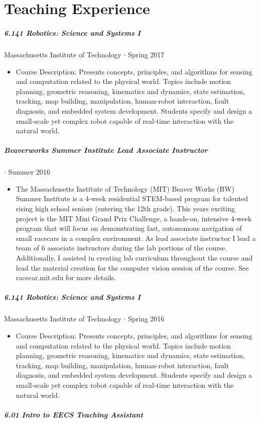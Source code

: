 \documentclass[10pt,letterpaper]{article}
\begin{document}
\section*{Teaching Experience}
\subparagraph{6.141 Robotics: Science and Systems I}
Massachusetts Institute of Technology $\cdot$ Spring 2017
\begin{itemize}
\item Course Description: Presents concepts, principles, and algorithms for sensing and computation related to the physical world. Topics include motion planning, geometric reasoning, kinematics and dynamics, state estimation, tracking, map building, manipulation, human-robot interaction, fault diagnosis, and embedded system development. Students specify and design a small-scale yet complex robot capable of real-time interaction with the natural world. 
\end{itemize}
\subparagraph{Beaverworks Summer Institute Lead Associate Instructor}
 $\cdot$ Summer 2016
\begin{itemize}
\item The Massachusetts Institute of Technology (MIT) Beaver Works (BW) Summer Institute is a 4-week residential STEM-based program for talented rising high school seniors (entering the 12th grade). This years exciting project is the MIT Mini Grand Prix Challenge, a hands-on, intensive 4-week program that will focus on demonstrating fast, autonomous navigation of small racecars in a complex environment. As lead associate instructor I lead a team of 6 associate instructors during the lab portions of the course.  Additionally, I assisted in creating lab curriculum throughout the course and lead the material creation for the computer vision session of the course. See racecar.mit.edu for more details.
\end{itemize}
\subparagraph{6.141 Robotics: Science and Systems I}
Massachusetts Institute of Technology $\cdot$ Spring 2016
\begin{itemize}
\item Course Description: Presents concepts, principles, and algorithms for sensing and computation related to the physical world. Topics include motion planning, geometric reasoning, kinematics and dynamics, state estimation, tracking, map building, manipulation, human-robot interaction, fault diagnosis, and embedded system development. Students specify and design a small-scale yet complex robot capable of real-time interaction with the natural world. 
\end{itemize}
\subparagraph{6.01 Intro to EECS Teaching Assistant}
\end{document}
